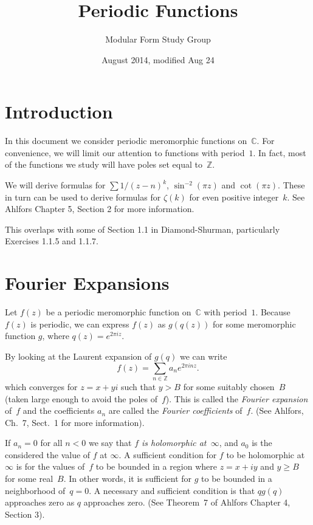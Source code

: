 \documentclass {amsart}
\theoremstyle{plain}
\theoremstyle{definition}
\theoremstyle{remark}
\newcommand{\bZ}{{\mathbb{Z}}}
\newcommand{\bC}{{\mathbb{C}}}
\begin{document}
 

\title{Periodic Functions}

\author{Modular Form Study Group}

\date{August 2014, modified Aug 24}

\maketitle


\section {Introduction}

In this document we consider periodic meromorphic functions on~$\bC$. For convenience, we will limit our attention to functions with period~$1$.  In fact, most of the functions we study will have poles set equal to~$\bZ$.

We will derive formulas for $\sum 1/(z - n)^k$, $\sin^{-2} (\pi z)$ and $\cot (\pi z)$. 
These in turn can be used to derive formulas for $\zeta(k)$ for even positive integer~$k$. 
See Ahlfors Chapter 5, Section 2 for more information.

This overlaps with some of Section 1.1 
in Diamond-Shurman,
particularly Exercises 1.1.5 and 1.1.7.


\section {Fourier Expansions}


Let $f(z)$ be a periodic meromorphic function on~$\bC$ with period~$1$.
Because $f(z)$ is periodic, we can express $f(z)$ as $g(q(z))$ for some
meromorphic function $g$, where $q(z) = e^{2\pi i z}$.

By looking at the Laurent expansion of $g(q)$ we can write 
$$
f(z)  = \sum_{n \in \bZ} a_n e^{2\pi i n z}.
$$
which converges for $z = x + yi$ such that $y > B$ for some suitably chosen~$B$ (taken large enough to avoid the poles of~$f$).
This is called the \emph{Fourier expansion} of~$f$
and the coefficients $a_n$ are called the \emph{Fourier coefficients} of~$f$.
(See Ahlfors, Ch.~7, Sect.~1 for more information).

If $a_n = 0$ for all $n < 0$ we say that \emph{$f$ is holomorphic at~$\infty$},
and $a_0$ is the considered the value of $f$ at $\infty$.
A sufficient condition for $f$ to be holomorphic at~$\infty$
is for the values of~$f$ to be bounded in a region where $z = x + i y$ and $y \ge B$ for some
real~$B$.
In other words, it is sufficient for $g$ to be bounded in a neighborhood of~$q=0$.
A necessary and sufficient condition is that $q g(q)$ approaches zero as $q$ approaches zero.
(See Theorem~7 of Ahlfors Chapter 4, Section 3).
\end{document}
